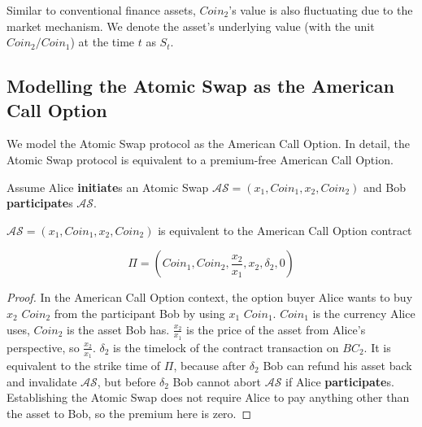 Similar to conventional finance assets, $Coin_2$'s value is also fluctuating due to the market mechanism.
We denote the asset's underlying value (with the unit $Coin_2 / Coin_1$) at the time $t$ as $S_t$.















\subsection{Modelling the Atomic Swap as the American Call Option}

We model the Atomic Swap protocol as the American Call Option.
In detail, the Atomic Swap protocol is equivalent to a premium-free American Call Option.

Assume Alice \textbf{initiate}s an Atomic Swap $\mathcal{AS} = (x_1, Coin_1, x_2, Coin_2)$ and Bob \textbf{participate}s $\mathcal{AS}$.

\begin{theorem}
$\mathcal{AS} = (x_1, Coin_1, x_2, Coin_2)$ is equivalent to the American Call Option contract

$$
\Pi = (Coin_1, Coin_2, \frac{x_2}{x_1}, x_2, \delta_2, 0)
$$

\end{theorem}


\begin{proof}
In the American Call Option context, the option buyer Alice wants to buy $x_2$ $Coin_2$ from the participant Bob by using $x_1$ $Coin_1$.
$Coin_1$ is the currency Alice uses, $Coin_2$ is the asset Bob has.
$\frac{x_2}{x_1}$ is the price of the asset from Alice's perspective, so $\frac{x_2}{x_1}$.
$\delta_2$ is the timelock of the contract transaction on $BC_2$.
It is equivalent to the strike time of $\Pi$, because after $\delta_2$ Bob can refund his asset back and invalidate $\mathcal{AS}$, but before $\delta_2$ Bob cannot abort $\mathcal{AS}$ if Alice \textbf{participate}s.
Establishing the Atomic Swap does not require Alice to pay anything other than the asset to Bob, so the premium here is zero.
\end{proof}












